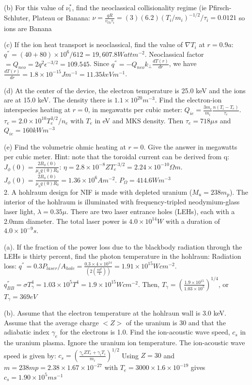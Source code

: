 \documentclass[10pt]{extarticle}
\begin{document}
\begin{multicols}{3}
 (b)  For this value of $\nu^{*}_{i}$, find the neoclassical collisionality regime (ie Pfirsch-Schluter, Plateau or Banana:
$\nu = \frac{qR}{v_{th}\tau_{i}} = (3)(6.2)(T_{i}/m_{i})^{-1/2}/\tau_{i} = 0.0121$ so ions are Banana 
 
 
 (c) If the ion heat transport is neoclassical, find the value of $\nabla T_{i}$ at $r=0.9a$: $q^{''} = (40+80)\times 10^{6}/612 = 19,607.8 Watt m^{-2}$.  Neoclassical factor $ = Q_{neo} = 2q^{2}\epsilon^{-3/2} = 109.545$.  Since $q^{''} = -Q_{neo}k_{\perp}\frac{dT(r)}{dr}$, we have $\frac{dT(r)}{dr} = 1.8 \times 10^{-15}Jm^{-1} = 11.35keVm^{-1}$.
 
 (d) At the center of the device, the electron temperature is 25.0 keV and the ions are at 15.0 keV. The density there is $1.1\times10^{20}m^{-3}$. Find the electron-ion interspecies heating at $r=0$, in megawatts per cubic meter: $Q_{ie} = \frac{3m_{e}}{m_{i}}\frac{n(T_{i}-T_{e})}{\tau_{e}}$.  $\tau_{e} = 2.0\times 10^{10}T_{e}^{3/2}/n_{e}$ with $T_{e}$ in eV and MKS density.  Then $\tau_{e} = 718\mu s$ and $Q_{ie} = 160 kW m^{-3}$ 
 
 (e) Find the volumetric ohmic heating at $r=0$.  Give the answer in megawatts per cubic meter.  Hint: note that the toroidal current can be derived from q: $J_{\phi}(0) = \frac{2B_{\phi}(0)}{\mu_{0} q(0)R_{0}}$: $\eta = 2.8 \times 10^{-8}ZT_{e}^{-3/2} = 2.24\times 10^{-10} \Omega m$.  $J_{\phi}(0) = \frac{2B_{\phi}(0)}{\mu_{0}q(0)R_{0}} = 1.36\times 10^{6} A m^{-2}$.  $P_{\Omega} = 414.6W m^{-3}$\\
2. A hohlraum design for NIF is made with depleted uranium ($M_{u} = 238m_{p}$).  The interior of the hohlraum is illuminated with frequency-tripled neodymium-glass laser light, $\lambda = 0.35\mu$. There are two laser entrance holes (LEHs), each with a 2.0mm diameter.  The total laser power is $4.0\times 10^{14} W$ with a duration of $4.0\times 10^{-9}s$. 

(a). If the fraction of the power loss due to the blackbody radiation through the LEHs is thirty percent, find the photon temperature in the hohlraun: Radiation loss: $q^{''} = 0.3P_{laser} /A_{hole} = \frac{0.3\times4\times10^{14}}{(2(\frac{\pi d^{2}}{4	}))} = 1.91 \times 10^{15}Wcm^{-2}$. 
$q^{''}_{BB} = \sigma T_{\gamma}^{4} = 1.03 \times 10^{5}T^{4} = 1.9\times 10^{15} W cm^{-2}$.  Then, $T_{\gamma} =  (\frac{1.9\times 10^{15}}{1.03\times 10^{5}})^{1/4}$, or $T_{\gamma} = 369 eV$

(b). Assume that the electron temperature at the hohlraun wall is 3.0 keV.  Assume that the average charge $<Z>$ of the uranium is 30 and that the adiabatic index $\gamma_{e}$ for the electrons is 1.0.  Find the ion-acoustic wave speed, $c_{s}$ in the uranium plasma.  Ignore the uranium ion temperature.
The ion-acoustic wave speed is given by: 
$c_{s} = (\frac{\gamma_{e}ZT_{e} + \gamma_{i}T_{i}}{m_{i}})^{1/2}$
Using $Z=30$ and $m=238mp= 2.38 \times 1.67 \times 10^{-27}$ with $T_{e} = 3000 \times 1.6 \times 10^{-19}$ gives $c_{s} = 1.90\times 10^{5}ms^{-1}$


\end{multicols}
\end{document}
